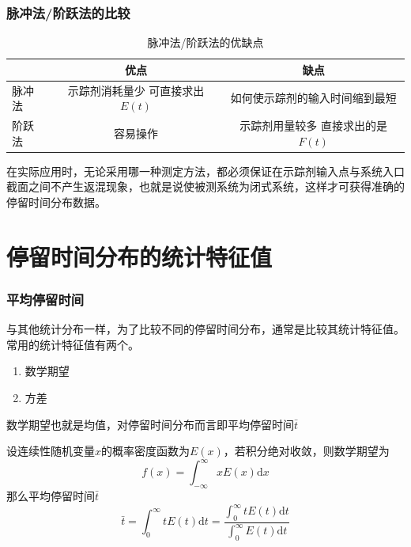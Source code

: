 \documentclass[dvipsnames, svgnames, x11names]{beamer}
\begin{document}
\begin{frame}
    \frametitle{脉冲法/阶跃法的比较}

    \begin{table}[]
        \caption{脉冲法/阶跃法的优缺点}
        \begin{tabular}{l|cc}
        \hline
         & 优点 & 缺点 \\ \hline
        脉冲法 & \makecell{示踪剂消耗量少 \\ 可直接求出$E(t)$} & 如何使示踪剂的输入时间缩到最短 \\ \cline{2-3} 
        阶跃法 & 容易操作 & \makecell{示踪剂用量较多 \\ 直接求出的是$F(t)$} \\ \hline
        \end{tabular}
        \end{table}
        在实际应用时，无论采用哪一种测定方法，都必须保证在示踪剂输入点与系统入口截面之间不产生返混现象，也就是说使被测系统为闭式系统，这样才可获得准确的停留时间分布数据。

\end{frame}


\section{停留时间分布的统计特征值}




\begin{frame}
    \frametitle{平均停留时间}
    与其他统计分布一样，为了比较不同的停留时间分布，通常是比较其统计特征值。常用的统计特征值有两个。
    \begin{enumerate}
      \item 数学期望
      \item 方差
    \end{enumerate}
    数学期望也就是均值，对停留时间分布而言即平均停留时间$\bar t$

    设连续性随机变量$x$的概率密度函数为$E(x)$，若积分绝对收敛，则数学期望为
    \[
        f(x) = \int_{-\infty}^{\infty} x E(x) \mathrm{d} x
    \]
    那么平均停留时间$\bar t$
    \[
            \bar{t}=\int_{0}^{\infty} t E(t) \mathrm{d} t=\frac{\int_{0}^{\infty} t E(t) \mathrm{d} t}{\int_{0}^{\infty} E(t) \mathrm{d} t}
    \]
\end{frame}
\end{document}
